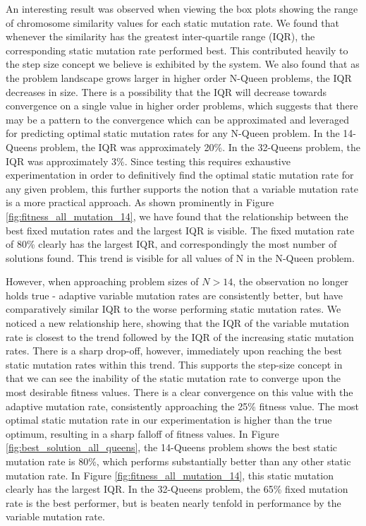 \documentclass[conference]{IEEEtran}
\begin{document}
An interesting result was observed when viewing the box plots showing the range of chromosome similarity values for each static mutation rate. We found that whenever the similarity has the greatest inter-quartile range (IQR), the corresponding static mutation rate performed best. This contributed heavily to the step size concept we believe is exhibited by the system. We also found that as the problem landscape grows larger in higher order N-Queen problems, the IQR decreases in size. There is a possibility that the IQR will decrease towards convergence on a single value in higher order problems, which suggests that there may be a pattern to the convergence which can be approximated and leveraged for predicting optimal static mutation rates for any N-Queen problem. In the 14-Queens problem, the IQR was approximately 20\%. In the 32-Queens problem, the IQR was approximately 3\%. Since testing this requires exhaustive experimentation in order to definitively find the optimal static mutation rate for any given problem, this further supports the notion that a variable mutation rate is a more practical approach. As shown prominently in Figure \ref{fig:fitness_all_mutation_14}, we have found that the relationship between the best fixed mutation rates and the largest IQR is visible. The fixed mutation rate of 80\% clearly has the largest IQR, and correspondingly the most number of solutions found. This trend is visible for all values of N in the N-Queen problem. 

However, when approaching problem sizes of $N > 14$, the observation no longer holds true - adaptive variable mutation rates are consistently better, but have comparatively similar IQR to the worse performing static mutation rates. We noticed a new relationship here, showing that the IQR of the variable mutation rate is closest to the trend followed by the IQR of the increasing static mutation rates. There is a sharp drop-off, however, immediately upon reaching the best static mutation rates within this trend. This supports the step-size concept in that we can see the inability of the static mutation rate to converge upon the most desirable fitness values. There is a clear convergence on this value with the adaptive mutation rate, consistently approaching the 25\% fitness value. The most optimal static mutation rate in our experimentation is higher than the true optimum, resulting in a sharp falloff of fitness values. In Figure \ref{fig:best_solution_all_queens}, the 14-Queens problem shows the best static mutation rate is 80\%, which performs substantially better than any other static mutation rate. In Figure \ref{fig:fitness_all_mutation_14}, this static mutation clearly has the largest IQR. In the 32-Queens problem, the 65\% fixed mutation rate is the best performer, but is beaten nearly tenfold in performance by the variable mutation rate.
\end{document}
